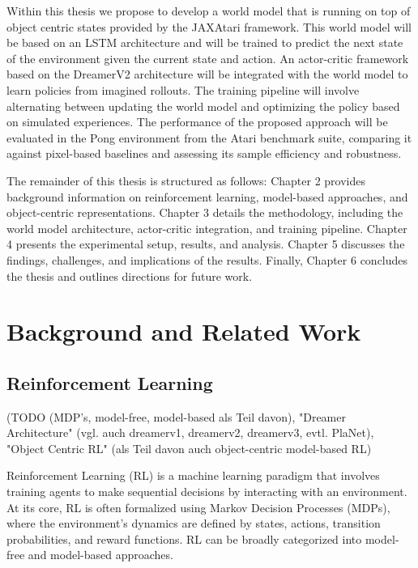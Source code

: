 \documentclass[
	english,
	ruledheaders=section,
	class=report,
	thesis={type=master},
	accentcolor=9c,
	custommargins=true,
	marginpar=false,
	parskip=half-,
	fontsize=11pt,
]{tudapub}
\begin{document}
Within this thesis we propose to develop a world model that is running on top of object centric states provided by the JAXAtari framework. This world model will be based on an LSTM architecture
and will be trained to predict the next state of the environment given the current state and action.
An actor-critic framework based on the DreamerV2 architecture will be integrated with the world model to learn policies from imagined rollouts.
The training pipeline will involve alternating between updating the world model and optimizing the policy based on simulated experiences.
The performance of the proposed approach will be evaluated in the Pong environment from the Atari benchmark suite, comparing it against pixel-based baselines and assessing its sample efficiency and robustness.

The remainder of this thesis is structured as follows:
Chapter 2 provides background information on reinforcement learning, model-based approaches, and object-centric representations.
Chapter 3 details the methodology, including the world model architecture, actor-critic integration, and training pipeline.
Chapter 4 presents the experimental setup, results, and analysis.
Chapter 5 discusses the findings, challenges, and implications of the results.
Finally, Chapter 6 concludes the thesis and outlines directions for future work.

\chapter{Background and Related Work}
\label{chap:background}

\section{Reinforcement Learning}
\label{sec:reinforcement_learning}

(TODO  (MDP's, model-free, model-based als Teil davon), "Dreamer Architecture" (vgl. auch dreamerv1, dreamerv2, dreamerv3, evtl. PlaNet), "Object Centric RL" (als Teil davon auch object-centric model-based RL)

Reinforcement Learning (RL) is a machine learning paradigm that involves
training agents to make sequential decisions by interacting with an
environment. At its core, RL is often formalized using Markov Decision
Processes (MDPs), where the environment's dynamics are defined by states,
actions, transition probabilities, and reward functions. RL can be broadly
categorized into model-free and model-based approaches.
\end{document}
